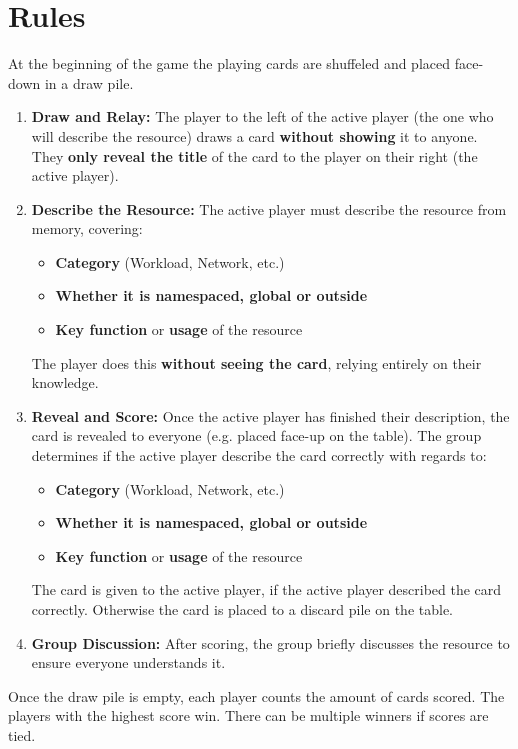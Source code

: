 \documentclass{article}
\begin{document}
\section*{Rules}
At the beginning of the game the playing cards are shuffeled and placed face-down in a draw pile.
\begin{enumerate}[label=\arabic*.]
    \item \textbf{Draw and Relay:} The player to the left of the active player (the one who will describe the resource) draws a card \textbf{without showing} it to anyone. They \textbf{only reveal the title} of the card to the player on their right (the active player).
    
    \item \textbf{Describe the Resource:} The active player must describe the resource from memory, covering:
    \begin{itemize}
        \item \textbf{Category} (Workload, Network, etc.)
        \item \textbf{Whether it is namespaced, global or outside}
        \item \textbf{Key function} or \textbf{usage} of the resource
    \end{itemize}
    The player does this \textbf{without seeing the card}, relying entirely on their knowledge.
    
    \item \textbf{Reveal and Score:} Once the active player has finished their description, the card is revealed to everyone (e.g. placed face-up on the table). The group determines if the active player describe the card correctly with regards to:
    \begin{itemize}
        \item \textbf{Category} (Workload, Network, etc.)
        \item \textbf{Whether it is namespaced, global or outside}
        \item \textbf{Key function} or \textbf{usage} of the resource
    \end{itemize}
	The card is given to the active player, if the active player described the card correctly. Otherwise the card is placed to a discard pile on the table.
    
    \item \textbf{Group Discussion:} After scoring, the group briefly discusses the resource to ensure everyone understands it.
\end{enumerate}
Once the draw pile is empty, each player counts the amount of cards scored. The players with the highest score win. There can be multiple winners if scores are tied.
\end{document}
